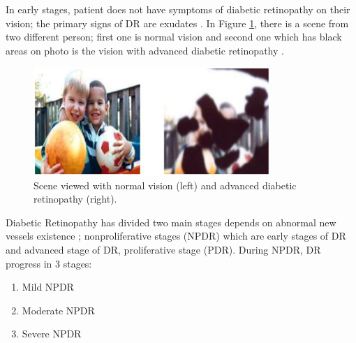 In early stages, patient does not have symptoms of diabetic retinopathy on their vision; the primary signs of DR are exudates \citep{nijalingappa2015machine}. In Figure \ref{visionOfDrAndNodr}, there is a scene from two different person; first one is normal vision and second one which has black areas on photo is the vision with advanced diabetic retinopathy \citep{NationalEyeInstitute}. 

\begin{figure}[t]
\centering
\includegraphics[width=0.8\textwidth]{Figures/vision_of_dr_and_nodr}
\caption{Scene viewed with normal vision (left) and advanced diabetic retinopathy (right).}
\label{visionOfDrAndNodr}
\end{figure}

Diabetic Retinopathy has divided two main stages depends on abnormal new vessels existence  \citep{tang2011inflammation, nijalingappa2015machine}; nonproliferative stages (NPDR) which are early stages of DR and advanced stage of DR, proliferative stage (PDR). 
During NPDR, DR progress in 3 stages:

    \begin{enumerate}
        \item Mild NPDR
        \item Moderate NPDR
        \item Severe NPDR
    \end{enumerate}


